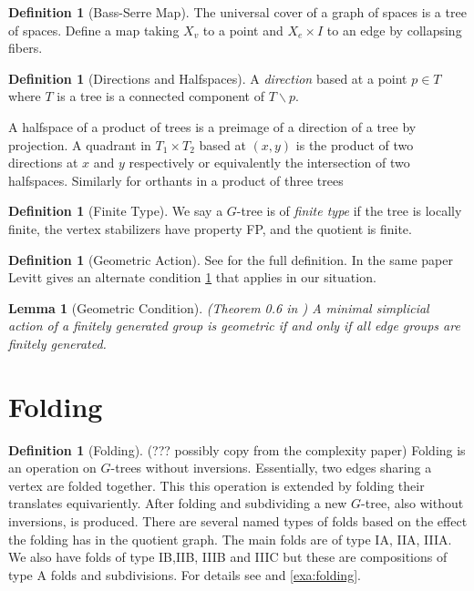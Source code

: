 \documentclass[12pt,parskip=full]{report}
\theoremstyle{plain}
\newtheorem{lem}[thm]{Lemma}
\theoremstyle{definition}
\newtheorem{dfn}[thm]{Definition}
\begin{document}
\begin{dfn}
    [Bass-Serre Map]
    \label{defn:bsmap}
    The universal cover of a graph of spaces is a tree of spaces. Define a map taking $X_v$ to a point and $X_e \times I$ to an edge by collapsing fibers.
\end{dfn}


\begin{dfn}
    [Directions and Halfspaces]
    \label{dfn:directionhalfspaces}
    A \emph{direction} based at a point \(p\in T\) where \(T\) is a tree is a connected component of \(T\smallsetminus p\).
    
    A halfspace of a product of trees is a preimage of a direction of a tree by projection. A quadrant in \(T_1\times T_2\) based at \((x,y)\) is the product of two directions at \(x\) and \(y\) respectively or equivalently the intersection of two halfspaces. Similarly for orthants in a product of three trees
\end{dfn}


\begin{dfn}
    [Finite Type]
    \label{defn:finitetype} 
    We say a $G$-tree is of \emph{finite type} if the tree is locally finite, the vertex stabilizers have property FP, and the quotient is finite.
\end{dfn}


 \begin{dfn}
     [Geometric Action]
     \label{defn:geometricaction}
     See \cite{levitt} for the full definition. In the same paper Levitt gives an alternate condition \ref{lem:simpgeo} that applies in our situation.
 \end{dfn}
\begin{lem}
    [Geometric Condition]
    \label{lem:simpgeo} 
    (Theorem 0.6 in \cite{levitt})
    A minimal simplicial action of a finitely generated group is geometric if and only if all edge groups are finitely generated.
\end{lem}

\section{Folding} 

\begin{dfn}
    [Folding]
    \label{defn:folding}
     (??? possibly copy from the complexity paper)
    Folding is an operation on \(G\)-trees without inversions. Essentially, two edges sharing a vertex are folded together. This this operation is extended by folding their translates equivariently. After folding and subdividing a new \(G\)-tree, also without inversions, is produced. There are several named types of folds based on the effect the folding has in the quotient graph. The main folds are of type IA, IIA, IIIA. We also have folds of type IB,IIB, IIIB and IIIC but these are compositions of type A folds and subdivisions. For details see \cite{boundingcomplexity} and \ref{exa:folding}.
\end{dfn}
\end{document}
